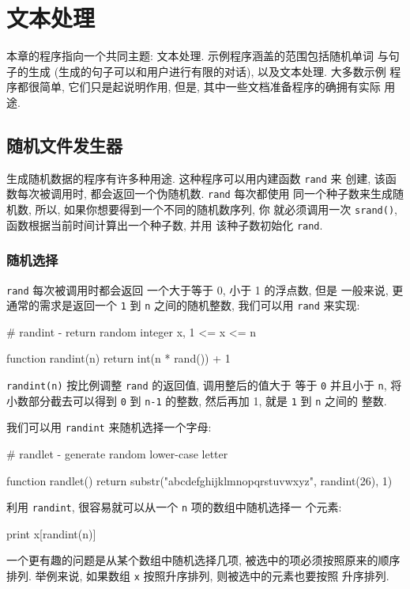 \chapter{文本处理}
\label{chap:processing_words}

本章的程序指向一个共同主题: 文本处理. 示例程序涵盖的范围包括随机单词
与句子的生成 (生成的句子可以和用户进行有限的对话), 以及文本处理. 大多数示例
程序都很简单, 它们只是起说明作用, 但是, 其中一些文档准备程序的确拥有实际
用途.

\section{随机文件发生器}
\label{sec:random_text_generation}

生成随机数据的程序有许多种用途. 这种程序可以用内建函数 \texttt{rand} 来
创建, 该函数每次被调用时, 都会返回一个伪随机数. \texttt{rand} 每次都使用
同一个种子数来生成随机数, 所以, 如果你想要得到一个不同的随机数序列, 你
就必须调用一次 \texttt{srand()}, 函数根据当前时间计算出一个种子数, 并用
该种子数初始化 \texttt{rand}.

\subsection{随机选择}
\label{subsec:random_choices}

\texttt{rand} 每次被调用时都会返回 一个大于等于 0, 小于 1 的浮点数, 但是
一般来说, 更通常的需求是返回一个 \texttt{1} 到 \texttt{n} 之间的随机整数,
我们可以用 \texttt{rand} 来实现:
\begin{awkcode}
    # randint - return random integer x, 1 <= x <= n

    function randint(n) {
        return int(n * rand()) + 1
    }
\end{awkcode}
\texttt{randint(n)} 按比例调整 \texttt{rand} 的返回值, 调用整后的值大于
等于 \texttt{0} 并且小于 \texttt{n}, 将小数部分截去可以得到 \texttt{0} 
到 \texttt{n-1} 的整数, 然后再加 1, 就是 \texttt{1} 到 \texttt{n} 之间的 
整数.

我们可以用 \texttt{randint} 来随机选择一个字母:
\begin{awkcode}
    # randlet - generate random lower-case letter

    function randlet() {
        return substr("abcdefghijklmnopqrstuvwxyz", randint(26), 1)
    }
\end{awkcode}

利用 \texttt{randint}, 很容易就可以从一个 \texttt{n} 项的数组中随机选择一
个元素:
\begin{awkcode}
    print x[randint(n)]
\end{awkcode}
一个更有趣的问题是从某个数组中随机选择几项, 被选中的项必须按照原来的顺序
排列. 举例来说, 如果数组 \texttt{x} 按照升序排列, 则被选中的元素也要按照
升序排列.

